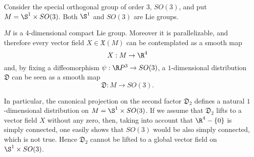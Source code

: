 \begin{example}
	\label{ex:nonvanishing}
	Consider the special orthogonal group of order 3, $SO(3)$, and put $M=\S^{1}\times SO(3)$. Both $\S^1$ and $SO(3)$ are Lie groups.
	
	$M$ is a 4-dimensional compact Lie group. Moreover it is parallelizable, and therefore every vector field $X\in\mathfrak{X}(M)$ can be contemplated as a smooth map $$X:M\rightarrow \R^{4}$$ and, by fixing a diffeomorphism $\psi:\R P^{3}\rightarrow SO(3)$, a $1$-dimensional distribution $\mathfrak{D}$ can be seen as a smooth map $$\mathfrak{D}:M\rightarrow SO(3).$$
	
	In particular, the canonical projection on the second factor $\mathfrak{D}_2$ defines a natural $1$-dimensional distribution on $M=\S^{1}\times SO(3)$. If we assume that $\mathfrak{D}_2$ lifts to a vector field $X$ without any zero, then, taking into account that $\R^{4}-\{0\}$ is simply connected, one easily shows that $SO(3)$ would be also simply connected, which is not true. Hence $\mathfrak{D}_2$ cannot be lifted to a global vector field on $\S^{1}\times SO(3)$.
\end{example}